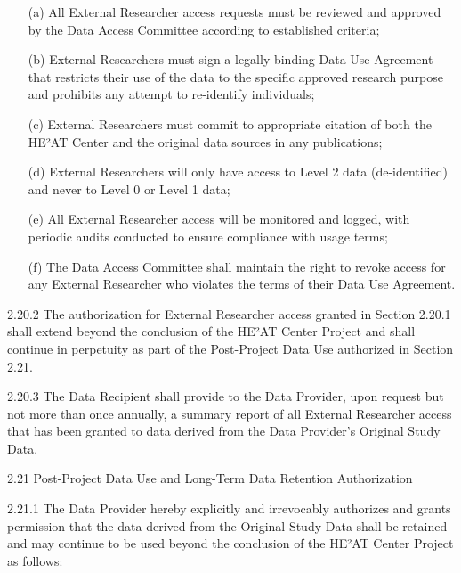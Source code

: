 \documentclass[12pt,letterpaper]{article}
\newcommand{\added}[1]{\textcolor{addcolor}{#1}}
\begin{document}
\added{\begin{enumerate}
\item[(a)] All External Researcher access requests must be reviewed and approved by the Data Access Committee according to established criteria;
   
\item[(b)] External Researchers must sign a legally binding Data Use Agreement that restricts their use of the data to the specific approved research purpose and prohibits any attempt to re-identify individuals;
   
\item[(c)] External Researchers must commit to appropriate citation of both the HE²AT Center and the original data sources in any publications;
   
\item[(d)] External Researchers will only have access to Level 2 data (de-identified) and never to Level 0 or Level 1 data;
   
\item[(e)] All External Researcher access will be monitored and logged, with periodic audits conducted to ensure compliance with usage terms;
   
\item[(f)] The Data Access Committee shall maintain the right to revoke access for any External Researcher who violates the terms of their Data Use Agreement.
\end{enumerate}}

\added{2.20.2 The authorization for External Researcher access granted in Section 2.20.1 shall extend beyond the conclusion of the HE²AT Center Project and shall continue in perpetuity as part of the Post-Project Data Use authorized in Section 2.21.}

\added{2.20.3 The Data Recipient shall provide to the Data Provider, upon request but not more than once annually, a summary report of all External Researcher access that has been granted to data derived from the Data Provider's Original Study Data.}

\added{2.21 Post-Project Data Use and Long-Term Data Retention Authorization}

\added{2.21.1 The Data Provider hereby explicitly and irrevocably authorizes and grants permission that the data derived from the Original Study Data shall be retained and may continue to be used beyond the conclusion of the HE²AT Center Project as follows:}
\end{document}
